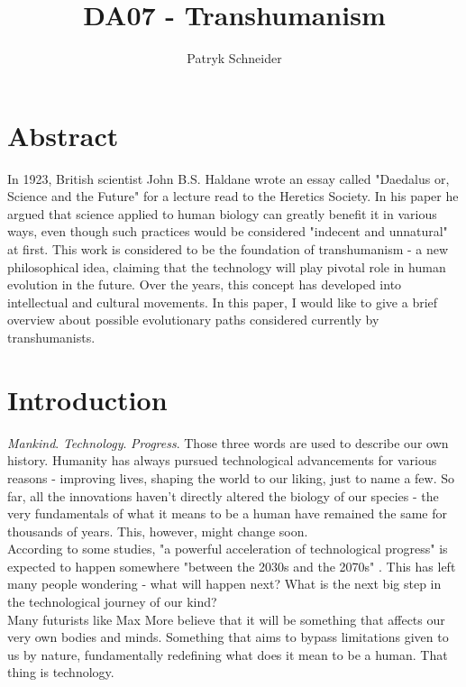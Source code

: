 \documentclass[12pt]{article}
\begin{document}
\author{Patryk Schneider}
\title{DA07 - Transhumanism}
\maketitle

\section{Abstract}
	In 1923, British scientist John B.S. Haldane wrote an essay called "Daedalus\; or, Science and the Future" for a lecture read to the Heretics Society. In his paper he argued that science applied to human biology can greatly benefit it in various ways, even though such practices would be considered "indecent and unnatural" \cite{haldane} at first. This work is considered to be the foundation of transhumanism - a new philosophical idea, claiming that the technology will play pivotal role in human evolution in the future. Over the years, this concept has developed into intellectual and cultural movements. In this paper, I would like to give a brief overview about possible evolutionary paths considered currently by transhumanists.

\newpage
\section{Introduction}
	\emph{Mankind}. \emph{Technology}. \emph{Progress}. Those three words are used to describe our own history. Humanity has always pursued technological advancements for various reasons - improving lives, shaping the world to our liking, just to name a few. So far, all the innovations haven't directly altered the biology of our species - the very fundamentals of what it means to be a human have remained the same for thousands of years. This, however, might change soon. 
	\\According to some studies, "a powerful acceleration of technological progress" is expected to happen somewhere "between the 2030s and the 2070s" \cite{progressRate}. This has left many people wondering - what will happen next? What is the next big step in the technological journey of our kind?
	\\Many futurists like Max More believe that it will be something that affects our very own bodies and minds. Something that aims to bypass limitations given to us by nature, fundamentally redefining what does it mean to be a human. That thing is technology.
\end{document}
